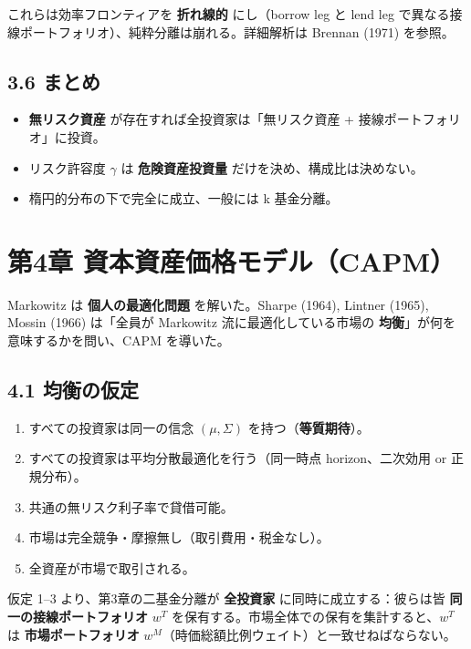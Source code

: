 \documentclass[11pt,a4paper]{report}
\begin{document}
これらは効率フロンティアを \textbf{折れ線的} にし（borrow leg と lend leg で異なる接線ポートフォリオ）、純粋分離は崩れる。詳細解析は Brennan (1971) を参照。

\section{3.6 まとめ}

\begin{itemize}
\item \textbf{無リスク資産} が存在すれば全投資家は「無リスク資産 + 接線ポートフォリオ」に投資。
\item リスク許容度 $\gamma$ は \textbf{危険資産投資量} だけを決め、構成比は決めない。
\item 楕円的分布の下で完全に成立、一般には k 基金分離。
\end{itemize}

\noindent\hrulefill

\chapter{第4章 資本資産価格モデル（CAPM）}

Markowitz は \textbf{個人の最適化問題} を解いた。Sharpe (1964), Lintner (1965), Mossin (1966) は「全員が Markowitz 流に最適化している市場の \textbf{均衡}」が何を意味するかを問い、CAPM を導いた。

\section{4.1 均衡の仮定}

\begin{enumerate}
\item すべての投資家は同一の信念 $(\mu, \Sigma)$ を持つ（\textbf{等質期待}）。
\item すべての投資家は平均分散最適化を行う（同一時点 horizon、二次効用 or 正規分布）。
\item 共通の無リスク利子率で貸借可能。
\item 市場は完全競争・摩擦無し（取引費用・税金なし）。
\item 全資産が市場で取引される。
\end{enumerate}

仮定 1–3 より、第3章の二基金分離が \textbf{全投資家} に同時に成立する：彼らは皆 \textbf{同一の接線ポートフォリオ} $w^T$ を保有する。市場全体での保有を集計すると、$w^T$ は \textbf{市場ポートフォリオ} $w^M$（時価総額比例ウェイト）と一致せねばならない。
\end{document}
